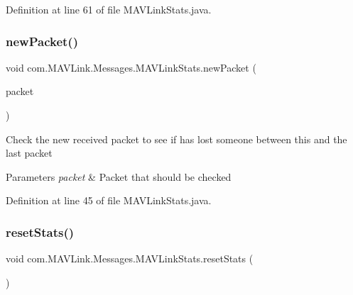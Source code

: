 Definition at line 61 of file M\+A\+V\+Link\+Stats.\+java.

\mbox{\label{classcom_1_1MAVLink_1_1Messages_1_1MAVLinkStats_aa1601a2fcc7ff51f2aa577272337bf8a}} 
\subsubsection{\texorpdfstring{newPacket()}{newPacket()}}
{\footnotesize\ttfamily void com.\+M\+A\+V\+Link.\+Messages.\+M\+A\+V\+Link\+Stats.\+new\+Packet (\begin{DoxyParamCaption}\item[{M\+A\+V\+Link\+Packet}]{packet }\end{DoxyParamCaption})\hspace{0.3cm}{\ttfamily [inline]}}

Check the new received packet to see if has lost someone between this and the last packet


\begin{DoxyParams}{Parameters}
{\em packet} & Packet that should be checked \\
\hline
\end{DoxyParams}


Definition at line 45 of file M\+A\+V\+Link\+Stats.\+java.

\mbox{\label{classcom_1_1MAVLink_1_1Messages_1_1MAVLinkStats_a265bed2364d06155083538d3d258ee46}} 
\subsubsection{\texorpdfstring{resetStats()}{resetStats()}}
{\footnotesize\ttfamily void com.\+M\+A\+V\+Link.\+Messages.\+M\+A\+V\+Link\+Stats.\+reset\+Stats (\begin{DoxyParamCaption}{ }\end{DoxyParamCaption})\hspace{0.3cm}{\ttfamily [inline]}}



